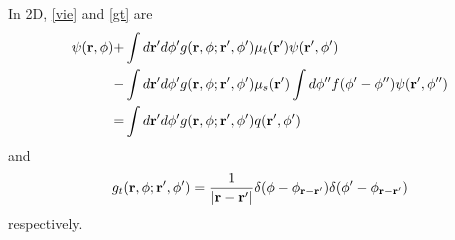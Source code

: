 \documentclass[main]{subfiles}
\begin{document}
In 2D, \eqref{vie} and \eqref{gt} are
\begin{equation} \label{vie2d}
	\begin{split} 
		\psi(\mathbf{r},\phi) +& \int d\mathbf{r}^{\prime} d\phi^{\prime}
		g(\mathbf{r},\phi;\mathbf{r}^{\prime},\phi^{\prime})
		\mu_t(\mathbf{r}^{\prime})\psi(\mathbf{r}^{\prime},\phi^{\prime})
		\\
		-& \int d\mathbf{r}^{\prime} d\phi^{\prime} g(\mathbf{r},\phi;\mathbf{r}^{\prime},\phi^{\prime})
		\mu_s(\mathbf{r}^{\prime}) \int d\phi^{{\prime\prime}}
		f(\phi^{\prime}-\phi^{{\prime\prime}})\psi(\mathbf{r}^{\prime},\phi^{{\prime\prime}})
		\\
		=& \int d\mathbf{r}^{\prime} d\phi^{\prime}
		g(\mathbf{r},\phi;\mathbf{r}^{\prime},\phi^{\prime})q(\mathbf{r}^{\prime},\phi^{\prime})
	\end{split}
\end{equation}
and
\begin{equation} \label{gt2d}
	g_t(\mathbf{r},\phi;\mathbf{r}^{\prime},\phi^{\prime}) = \frac{1}{\left| \mathbf{r}-\mathbf{r}^{\prime} \right|} 
	\delta(\phi-\phi_{\mathbf{r}-\mathbf{r}^{\prime}})
	\delta(\phi^{\prime}-\phi_{\mathbf{r}-\mathbf{r}^{\prime}})
\end{equation}
respectively.


\end{document}
